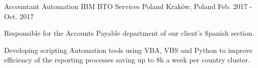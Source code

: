 \begin{cventries}
\cventry
    {Accountant Automation} %
    {IBM BTO Services Poland} %
    {Kraków, Poland} %
    {Feb. 2017 - Oct. 2017} %
    {
        \begin{cvitems} %
            \item {Responsible for the Accounts Payable department of our client's Spanish section.}
            \item {Developing scripting Automation tools using VBA, VBS and Python to improve efficiency of the reporting processes saving up to 8h a week per country cluster.}
        \end{cvitems}
    }

\end{cventries}

